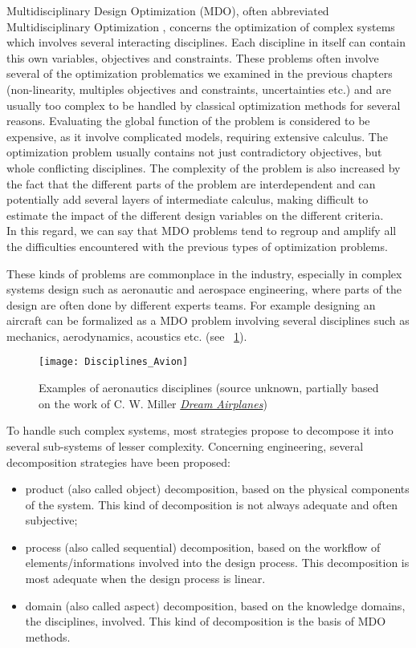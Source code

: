Multidisciplinary Design Optimization (MDO), often abbreviated Multidisciplinary Optimization , concerns the optimization of complex systems which involves several interacting disciplines. Each discipline in itself can contain this own variables, objectives and constraints. These problems often involve several of the optimization problematics we examined in the previous chapters (non-linearity, multiples objectives and constraints, uncertainties etc.) and are usually too complex to be handled by classical optimization methods for several reasons. Evaluating the global function of the problem is considered to be expensive, as it involve complicated models, requiring extensive calculus. The optimization problem usually contains not just contradictory objectives, but whole conflicting disciplines. The complexity of the problem is also increased by the fact that the different parts of the problem are interdependent and can potentially add several layers of intermediate calculus, making difficult to estimate the impact of the different design variables on the different criteria.\\
In this regard, we can say that MDO problems tend to regroup and amplify all the difficulties encountered with the previous types of optimization problems.

These kinds of problems are commonplace in the industry, especially in complex systems design such as aeronautic and aerospace engineering, where parts of the design are often done by different experts teams. For example designing an aircraft can be formalized as a MDO problem involving several disciplines such as mechanics, aerodynamics, acoustics etc. (see \figurename\ \ref{aero-disc}).

\begin{figure}
\centering
\texttt{[image: Disciplines\_Avion]}
\caption{Examples of aeronautics disciplines (source unknown, partially based on the work of C. W. Miller \href{http://thehuwaldtfamily.org/jtrl/research/Airplane\%20Design/Dream\%20Airplane\%20Systems\%20Bias.pdf}{\emph{Dream Airplanes}})}
\label{aero-disc}
\end{figure}

To handle such complex systems, most strategies propose to decompose it into several sub-systems of lesser complexity. Concerning engineering, several decomposition strategies have been proposed\cite{kusiak1995decomposition}:

\begin{itemize}
\item product (also called object) decomposition, based on the physical components of the system. This kind of decomposition is not always adequate and often subjective;
\item process  (also called sequential) decomposition, based on the workflow of elements/informations involved into the design process. This decomposition is most adequate when the design process is linear.
\item domain (also called aspect) decomposition, based on the knowledge domains, the disciplines, involved. This kind of decomposition is the basis of MDO methods.
\end{itemize}

